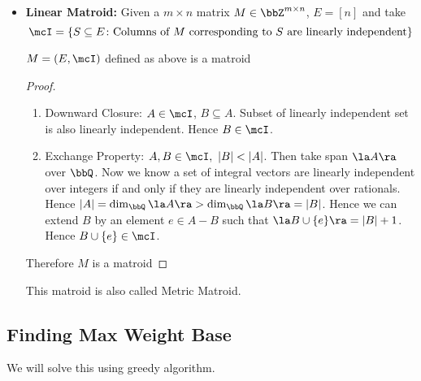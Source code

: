 \begin{itemize}[label=$\bullet$]
\item \textbf{Linear Matroid:} Given a $m\times n$ matrix $M\in \bbZ^{m\times n}$, $E=[n]$ and take $$\mcI=\{S\subseteq E\colon \text{Columns of $M$ corresponding to $S$ are linearly independent} \}$$
\begin{lemma}{}{}
	$M=(E,\mcI)$ defined as above is a matroid
\end{lemma}
\begin{proof}
	\begin{enumerate}[label=\bfseries\tiny\protect\circled{\small\arabic*}]
		\item Downward Closure: $A\in \mcI$, $B\subseteq A$. Subset of linearly independent set is also linearly independent. Hence $B\in \mcI$. 
		\item Exchange Property: $A,B\in\mcI,\ |B|<|A|$. Then take span $\la A\ra$ over $\bbQ$. Now we know a set of integral vectors are linearly independent over integers if and only if they are linearly independent over rationals. Hence $|A|=\dim _{\bbQ}\la A\ra> \dim _{\bbQ}\la B\ra=|B|$. Hence we can extend $B$ by an element $e\in A-B$ such that $\la B\cup \{e\}\ra =|B|+1$. Hence $B\cup \{e\}\in \mcI$.
	\end{enumerate}Therefore $M$ is a matroid
\end{proof}
This matroid is also called Metric Matroid.
\end{itemize}
\subsection{Finding Max Weight Base}
\begin{algoprob}
\end{algoprob}

We will solve this using greedy algorithm.

